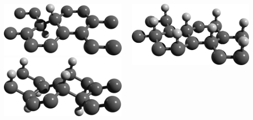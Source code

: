 \documentclass{beamer}
\begin{document}
\begin{frame}

\begin{columns}


\begin{center}
\includegraphics[width=1.0\textwidth]{figs/row1.png}\\

\vspace{7mm}
\includegraphics[width=1.0\textwidth]{figs/alt3.png}\\


\vspace{5mm}
\end{center}


\centering
\begin{center}
\includegraphics[width=1.0\textwidth]{figs/up3.png}\\


\end{center}
\end{columns}
\end{frame}
\end{document}

